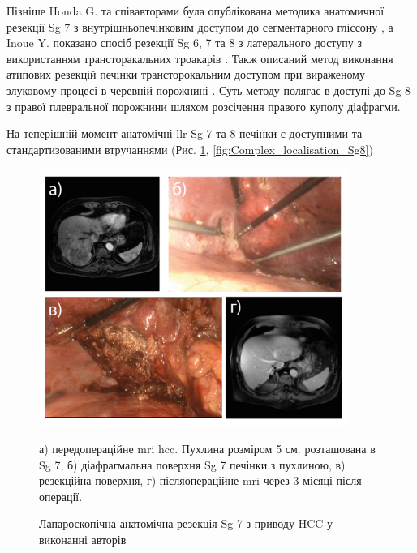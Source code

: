 Пізніше Honda G. та співавторами була опублікована методика анатомичної резекції Sg 7 з внутрішньопечінковим доступом до сегментарного  гліссону \cite{Okuda2017}, а Inoue Y. показано спосіб резекції Sg 6, 7 та 8 з латерального доступу з використанням трансторакальних троакарів \cite{Inoue2017}.  Такж описаний метод виконання атипових резекцій печінки трансторокальним доступом при вираженому злуковому процесі в черевній порожнині \cite{Kruger2014}. Суть методу полягає в доступі до Sg 8 з правої плевральної порожнини шляхом розсічення правого куполу діафрагми.

На теперішній момент анатомічні \acrshort{llr} Sg 7 та 8 печінки є доступними та стандартизованими втручаннями (Рис. \ref{fig:Complex_localisation_Sg7}, \ref{fig:Complex_localisation_Sg8}) 


\begin{figure}[h]
\caption{Лапароскопічна анатомічна резекція Sg 7 з приводу HCC у виконанні авторів}

\includegraphics[width=0.9\textwidth]{Illustrations/Chapter_01/Complex_localisation_Sg7.png}
\label{fig:Complex_localisation_Sg7}

\medskip
\small
а) передопераційне \acrshort{mri} \acrshort{hcc}. Пухлина розміром 5 см. розташована в Sg 7,  б) діафрагмальна поверхня Sg 7 печінки з пухлиною, в) резекційна поверхня, г) післяопераційне \acrshort{mri} через 3 місяці після операції.

\end{figure}


